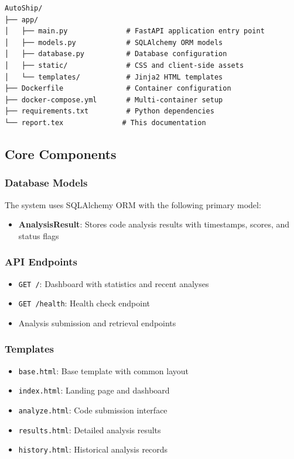 \documentclass[12pt]{article}
\begin{document}
\begin{lstlisting}
AutoShip/
├── app/
│   ├── main.py              # FastAPI application entry point
│   ├── models.py            # SQLAlchemy ORM models
│   ├── database.py          # Database configuration
│   ├── static/              # CSS and client-side assets
│   └── templates/           # Jinja2 HTML templates
├── Dockerfile               # Container configuration
├── docker-compose.yml       # Multi-container setup
├── requirements.txt         # Python dependencies
└── report.tex              # This documentation
\end{lstlisting}

\subsection{Core Components}

\subsubsection{Database Models}
The system uses SQLAlchemy ORM with the following primary model:
\begin{itemize}
    \item \textbf{AnalysisResult}: Stores code analysis results with timestamps, scores, and status flags
\end{itemize}

\subsubsection{API Endpoints}
\begin{itemize}
    \item \texttt{GET /}: Dashboard with statistics and recent analyses
    \item \texttt{GET /health}: Health check endpoint
    \item Analysis submission and retrieval endpoints
\end{itemize}

\subsubsection{Templates}
\begin{itemize}
    \item \texttt{base.html}: Base template with common layout
    \item \texttt{index.html}: Landing page and dashboard
    \item \texttt{analyze.html}: Code submission interface
    \item \texttt{results.html}: Detailed analysis results
    \item \texttt{history.html}: Historical analysis records
\end{itemize}
\end{document}
